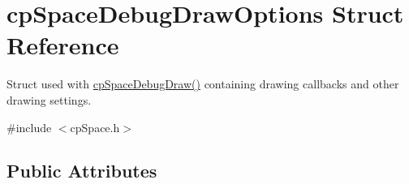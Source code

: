\hypertarget{structcp_space_debug_draw_options}{}\section{cp\+Space\+Debug\+Draw\+Options Struct Reference}
\label{structcp_space_debug_draw_options}


Struct used with \mbox{\hyperlink{group__cp_space_ga02e8a34681aff3f29bd976e830f3b6da}{cp\+Space\+Debug\+Draw()}} containing drawing callbacks and other drawing settings.  




{\ttfamily \#include $<$cp\+Space.\+h$>$}

\subsection*{Public Attributes}
